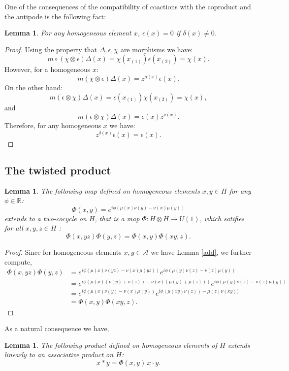 \documentclass[12pt]{amsart}
\newtheorem{lem}[thm]{Lemma}
\theoremstyle{definition}
\numberwithin{equation}{section}
\newcommand{\A}{\mathcal{A}}        %
\renewcommand{\a}{\chi}             %
\newcommand{\R}{\mathbb{R}}         %
\newcommand{\ox}{\otimes}           %
\begin{document}
One of the consequences of the compatibility of coactions with the coproduct and the antipode is the following fact:
\begin{lem}
\label{counit}
For any homogeneous element $x$,  $\epsilon(x)=0$ if $\delta(x)\not=0$.
\end{lem}
\begin{proof}
Using the property that $\Delta, \epsilon, \a$ are morphisms we have:
$$ m \circ (\a \ox \epsilon) \Delta(x) = \a(x_{(1)}) \epsilon(x_{(2)}) = \a(x). $$
However, for a homogeneous $x$:
$$ m (\a \ox \epsilon) \Delta(x) = z^{\mu(x)} \epsilon(x). $$
On the other hand:
$$ m (\epsilon \ox \a) \Delta(x) = \epsilon(x_{(1)}) \a(x_{(2)})  = \a(x), $$
and
$$ m (\epsilon \ox \a) \Delta(x) = \epsilon(x)z^{\nu(x)}. $$
Therefore, for any homogeneous $x$ we have:
$$ z^{\delta(x)} \epsilon(x) = \epsilon(x). $$
\end{proof}
\subsection{The twisted product}

\begin{lem}\label{cocycle}
The following map defined on homogeneous elements $x,y \in H$ for any $\phi \in \R$:
$$\Phi (x, y) = e^{i \phi(\mu(x) \nu(y)  - \nu(x) \mu(y))}$$
extends to a two-cocycle on $H$, that is a map $ \Phi: H \otimes H \to U(1)$, 
which satifies for all $x,y,z \in H$ :
$$ \Phi(x, yz) \Phi(y,z) = \Phi(x,y) \Phi(xy,z).$$
\end{lem}
\begin{proof}
Since for homogeneous elements $x,y \in \A$ we have Lemma 
\ref{add}, we further compute,
$$
\begin{aligned}
\Phi(x, yz) \Phi(y,z) &=  e^{i \phi(\mu(x) \nu(yz)  - \nu(x) \mu(yz))}  
e^{i \phi(\mu(y) \nu(z)  - \nu(z) \mu(y))} \\
 &=  e^{i \phi(\mu(x) (\nu(y)+\nu(z))  - \nu(x) (\mu(y)+\mu(z)))} 
 e^{i \phi(\mu(y) \nu(z)  - \nu(z) \mu(y))}\\
& =  e^{i \phi(\mu(x) \nu(y) - \nu(x) \mu(y))} 
e^{i \phi( \mu(xy) \nu(z))  - \mu(z) \nu(xy))} \\
 & =  \Phi(x,y) \Phi(xy,z).
\end{aligned}
$$
\end{proof}
As a natural consequence we have,
\begin{lem}
\label{algebra}
The following product defined on homogeneous elements of 
$H$ extends linearly to an associative product on $H$:
$$ x \ast y =   \Phi(x, y) \, x \cdot y. $$
\end{lem}
\end{document}
